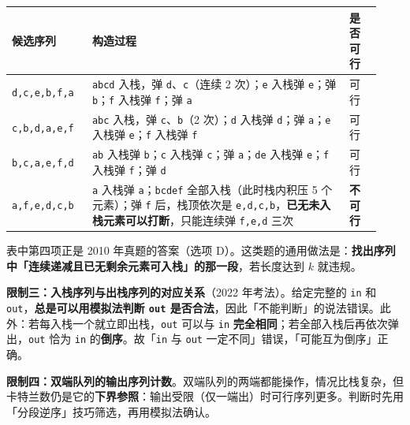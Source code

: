 \documentclass[11pt,openany,UTF8]{ctexbook}
\begin{document}
\begingroup\small\setlength{\tabcolsep}{4.0pt}
\begin{longtable}{@{}L{0.2027\linewidth}L{0.6413\linewidth}L{0.0845\linewidth}@{}}
\toprule
\textbf{候选序列} & \textbf{构造过程} & \textbf{是否可行} \\
\midrule
\endhead
\texttt{d,\allowbreak{}c,\allowbreak{}e,\allowbreak{}b,\allowbreak{}f,\allowbreak{}a} & \texttt{abcd} 入栈，弹 \texttt{d}、\texttt{c}（连续 2 次）；\texttt{e} 入栈弹 \texttt{e}；弹 \texttt{b}；\texttt{f} 入栈弹 \texttt{f}；弹 \texttt{a} & 可行 \\
\texttt{c,\allowbreak{}b,\allowbreak{}d,\allowbreak{}a,\allowbreak{}e,\allowbreak{}f} & \texttt{abc} 入栈，弹 \texttt{c}、\texttt{b}（2 次）；\texttt{d} 入栈弹 \texttt{d}；弹 \texttt{a}；\texttt{e} 入栈弹 \texttt{e}；\texttt{f} 入栈弹 \texttt{f} & 可行 \\
\texttt{b,\allowbreak{}c,\allowbreak{}a,\allowbreak{}e,\allowbreak{}f,\allowbreak{}d} & \texttt{ab} 入栈弹 \texttt{b}；\texttt{c} 入栈弹 \texttt{c}；弹 \texttt{a}；\texttt{de} 入栈弹 \texttt{e}；\texttt{f} 入栈弹 \texttt{f}；弹 \texttt{d} & 可行 \\
\texttt{a,\allowbreak{}f,\allowbreak{}e,\allowbreak{}d,\allowbreak{}c,\allowbreak{}b} & \texttt{a} 入栈弹 \texttt{a}；\texttt{bcdef} 全部入栈（此时栈内积压 5 个元素）；弹 \texttt{f} 后，栈顶依次是 \texttt{e,\allowbreak{}d,\allowbreak{}c,\allowbreak{}b}，\textbf{已无未入栈元素可以打断}，只能连续弹 \texttt{f,\allowbreak{}e,\allowbreak{}d} 三次 & \textbf{不可行} \\
\bottomrule
\end{longtable}
\endgroup

表中第四项正是 2010 年真题的答案（选项 D）。这类题的通用做法是：\textbf{找出序列中「连续递减且已无剩余元素可入栈」的那一段}，若长度达到 $k$ 就违规。

\textbf{限制三：入栈序列与出栈序列的对应关系}（2022 年考法）。给定完整的 \texttt{in} 和 \texttt{out}，\textbf{总是可以用模拟法判断 \texttt{out} 是否合法}，因此「不能判断」的说法错误。此外：若每入栈一个就立即出栈，\texttt{out} 可以与 \texttt{in} \textbf{完全相同}；若全部入栈后再依次弹出，\texttt{out} 恰为 \texttt{in} 的\textbf{倒序}。故「\texttt{in} 与 \texttt{out} 一定不同」错误，「可能互为倒序」正确。

\textbf{限制四：双端队列的输出序列计数}。双端队列的两端都能操作，情况比栈复杂，但卡特兰数仍是它的\textbf{下界参照}：输出受限（仅一端出）时可行序列更多。判断时先用「分段逆序」技巧筛选，再用模拟法确认。
\end{document}
